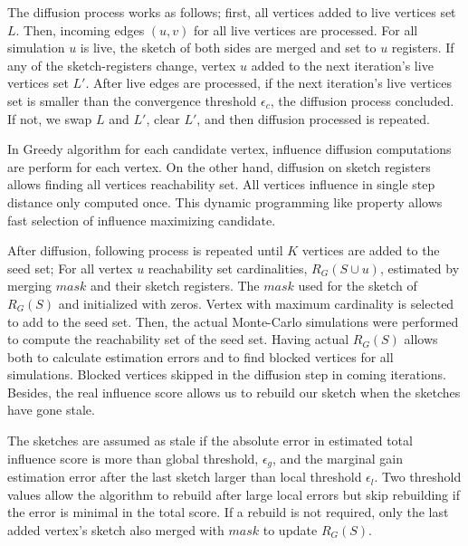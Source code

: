 \documentclass[10pt,journal,compsoc]{IEEEtran}
\begin{document}
The diffusion process works as follows; first, all vertices added to live vertices set $L$. Then, incoming edges $(u,v)$ for all live vertices are processed. For all simulation $u$ is live, the sketch of both sides are merged and set to $u$ registers. If any of the sketch-registers change, vertex $u$ added to the next iteration's live vertices set $L'$. After live edges are processed, if the next iteration's live vertices set is smaller than the convergence threshold $\epsilon_c$, the diffusion process concluded. If not, we swap $L$ and $L'$, clear $L'$, and then diffusion processed is repeated. 

In Greedy algorithm\cite{kempe2003maximizing} for each candidate vertex, influence diffusion computations are perform for each vertex.  On the other hand, diffusion on sketch registers allows finding all vertices reachability set. All vertices influence in single step distance only computed once. This dynamic programming like property allows fast selection of influence maximizing candidate.


After diffusion, following process is repeated until $K$ vertices are added to the seed set; For all vertex $u$ reachability set cardinalities, $R_G(S\cup u)$, estimated by merging $mask$ and their sketch registers. The $mask$ used for the sketch of $R_G(S)$ and initialized with zeros. Vertex with maximum cardinality is selected to add to the seed set. Then, the actual Monte-Carlo simulations were performed to compute the reachability set of the seed set. Having actual $R_G(S)$ allows both to calculate estimation errors and to find blocked vertices for all simulations. Blocked vertices skipped in the diffusion step in coming iterations. Besides, the real influence score allows us to rebuild our sketch when the sketches have gone stale.

The sketches are assumed as stale if the absolute error in estimated total influence score is more than global threshold, $\epsilon_{g}$, and the marginal gain estimation error after the last sketch larger than local threshold $\epsilon_{l}$. Two threshold values allow the algorithm to rebuild after large local errors but skip rebuilding if the error is minimal in the total score. If a rebuild is not required, only the last added vertex's sketch also merged with $mask$ to update $R_G(S)$. 
\end{document}
